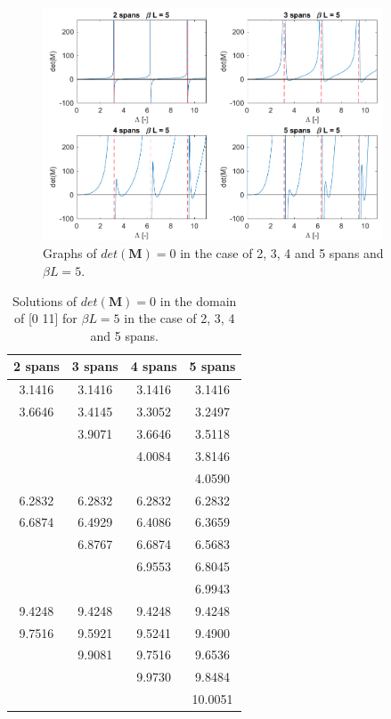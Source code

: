 \documentclass{article}
\begin{document}
{\begin{figure}[H]
    \centering
    \includegraphics[width=0.9\textwidth]{Figures/graphs2345.pdf}
    \caption{Graphs of $det(\textbf{M})=0$ in the case of 2, 3, 4 and 5 spans and $\beta L=5$.}
    \label{fig:2345spans}
\end{figure}
\begin{table}[H]
    \centering
    \begin{tabular}{c c c c }
         2 spans & 3 spans & 4 spans & 5 spans \\
         \midrule
         3.1416 & 3.1416 & 3.1416 & 3.1416 \\
         3.6646 & 3.4145 & 3.3052 & 3.2497 \\
                & 3.9071 & 3.6646 & 3.5118 \\
                &        & 4.0084 & 3.8146 \\
                &        &        & 4.0590 \\
         6.2832 & 6.2832 & 6.2832 & 6.2832 \\
         6.6874 & 6.4929 & 6.4086 & 6.3659 \\
                & 6.8767 & 6.6874 & 6.5683 \\
                &        & 6.9553 & 6.8045 \\
                &        &        & 6.9943 \\
         9.4248 & 9.4248 & 9.4248 & 9.4248 \\
         9.7516 & 9.5921 & 9.5241 & 9.4900 \\
                & 9.9081 & 9.7516 & 9.6536 \\
                &        & 9.9730 & 9.8484 \\
                &        &        & 10.0051 \\
    \end{tabular}
    \caption{Solutions of $det(\textbf{M})=0$ in the domain of [0 11] for $\beta L = 5$ in the case of 2, 3, 4 and 5 spans.}
    \label{tab:res2345}
\end{table}

}
\end{document}
